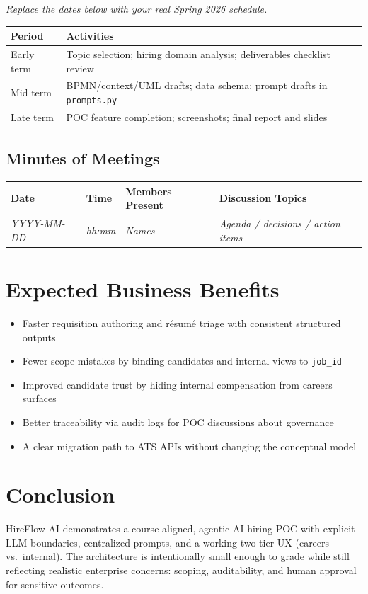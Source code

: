 \documentclass[12pt]{article}
\begin{document}
\textit{Replace the dates below with your real Spring 2026 schedule.}

\begin{longtable}{|p{4cm}|p{12cm}|}
\hline
\textbf{Period} & \textbf{Activities} \\
\hline
Early term & Topic selection; hiring domain analysis; deliverables checklist review \\
\hline
Mid term & BPMN/context/UML drafts; data schema; prompt drafts in \texttt{prompts.py} \\
\hline
Late term & POC feature completion; screenshots; final report and slides \\
\hline
\end{longtable}

\subsection{Minutes of Meetings}

\begin{longtable}{|p{2.5cm}|p{2.5cm}|p{3.5cm}|p{8cm}|}
\hline
\textbf{Date} & \textbf{Time} & \textbf{Members Present} & \textbf{Discussion Topics} \\
\hline
\textit{YYYY-MM-DD} & \textit{hh:mm} & \textit{Names} & \textit{Agenda / decisions / action items} \\
\hline
\end{longtable}

\section{Expected Business Benefits}

\begin{itemize}
    \item Faster requisition authoring and résumé triage with consistent structured outputs
    \item Fewer scope mistakes by binding candidates and internal views to \texttt{job\_id}
    \item Improved candidate trust by hiding internal compensation from careers surfaces
    \item Better traceability via audit logs for POC discussions about governance
    \item A clear migration path to ATS APIs without changing the conceptual model
\end{itemize}

\section{Conclusion}

HireFlow AI demonstrates a course-aligned, agentic-AI hiring POC with explicit LLM boundaries, centralized prompts, and a working two-tier UX (careers vs.\ internal). The architecture is intentionally small enough to grade while still reflecting realistic enterprise concerns: scoping, auditability, and human approval for sensitive outcomes.
\end{document}
